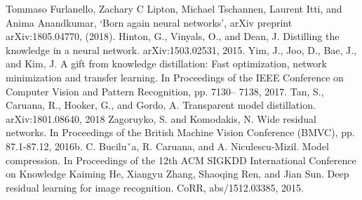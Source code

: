 \begin{thebibliography}{6}


 Tommaso Furlanello, Zachary C Lipton, Michael Tschannen, Laurent
Itti, and Anima Anandkumar, ‘Born again neural networks’, arXiv
preprint arXiv:1805.04770, (2018).
 Hinton, G., Vinyals, O., and Dean, J. Distilling the knowledge in a neural network. arXiv:1503.02531, 2015.
Yim, J., Joo, D., Bae, J., and Kim, J. A gift from knowledge
distillation: Fast optimization, network minimization and
transfer learning. In Proceedings of the IEEE Conference
on Computer Vision and Pattern Recognition, pp. 7130–
7138, 2017.
Tan, S., Caruana, R., Hooker, G., and Gordo, A. Transparent
model distillation. arXiv:1801.08640, 2018
 Zagoruyko, S. and Komodakis, N. Wide residual networks.
In Proceedings of the British Machine Vision Conference
(BMVC), pp. 87.1-87.12, 2016b.
 C. Buciluˇa, R. Caruana, and A. Niculescu-Mizil. Model compression. In Proceedings of the
12th ACM SIGKDD International Conference on Knowledge
Kaiming He, Xiangyu Zhang, Shaoqing Ren, and Jian Sun. Deep residual learning for image recognition. CoRR, abs/1512.03385, 2015.
\end{thebibliography}
